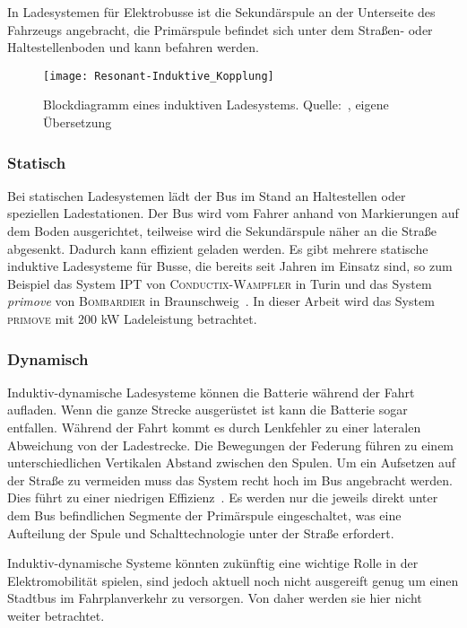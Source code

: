 In Ladesystemen für Elektrobusse ist die Sekundärspule an der Unterseite des Fahrzeugs angebracht, die Primärspule befindet sich unter dem Straßen- oder Haltestellenboden und kann befahren werden.


\begin{figure}\centering
	\texttt{[image: Resonant-Induktive\_Kopplung]}
	\caption[Blockdiagramm eines induktiven Ladesystems]{Blockdiagramm eines induktiven Ladesystems. Quelle:~\cite{lukic2013cutting}, eigene Übersetzung}
	\label{abb_ResIndKopplung}
\end{figure}

\subsubsection{Statisch}
Bei statischen Ladesystemen lädt der Bus im Stand an Haltestellen oder speziellen Ladestationen. Der Bus wird vom Fahrer anhand von Markierungen auf dem Boden ausgerichtet, teilweise wird die Sekundärspule näher an die Straße abgesenkt. Dadurch kann effizient geladen werden. Es gibt mehrere statische induktive Ladesysteme für Busse, die bereits seit Jahren im Einsatz sind, so zum Beispiel das System \textsc{IPT} von \textsc{Conductix-Wampfler} in Turin und das System \emph{primove} von \textsc{Bombardier} in Braunschweig~\cite{WeIPT}. In dieser Arbeit wird das System \textsc{primove} mit 200 kW Ladeleistung betrachtet.

\subsubsection{Dynamisch}
Induktiv-dynamische Ladesysteme können die Batterie während der Fahrt aufladen. Wenn die ganze Strecke ausgerüstet ist kann die Batterie sogar entfallen. Während der Fahrt kommt es durch Lenkfehler zu einer lateralen Abweichung von der Ladestrecke. Die Bewegungen der Federung führen zu einem unterschiedlichen Vertikalen Abstand zwischen den Spulen. Um ein Aufsetzen auf der Straße zu vermeiden muss das System recht hoch im Bus angebracht werden. Dies führt zu einer niedrigen Effizienz~\cite{5618092}. Es werden nur die jeweils direkt unter dem Bus befindlichen Segmente der Primärspule eingeschaltet, was eine Aufteilung der Spule und Schalttechnologie unter der Straße erfordert.

Induktiv-dynamische Systeme könnten zukünftig eine wichtige Rolle in der Elektromobilität spielen, sind jedoch aktuell noch nicht ausgereift genug um einen Stadtbus im Fahrplanverkehr zu versorgen. Von daher werden sie hier nicht weiter betrachtet. 

